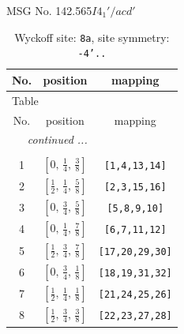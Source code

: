 \documentclass[fleqn,8pt]{jsarticle}
\begin{document}
\setcounter{MaxMatrixCols}{32}

\renewcommand{\tablename}{Table~}
\renewcommand{\figurename}{Figure~}
\begin{center}
\LARGE
MSG No. 142.565\quad$I4_{1}'/acd'$
\end{center}
\renewcommand{\arraystretch}{1.2}
\begin{longtable}{ccc}
\caption{Wyckoff site: {\tt 8a}, site symmetry: {\tt -4'..}}
 \\
 \hline \hline
No. & position & mapping \\ \hline \endfirsthead

\multicolumn{2}{l}{\tablename\ \thetable{}} \\
 \hline \hline
No. & position & mapping \\ \hline \endhead

 \hline \hline
\multicolumn{2}{r}{\footnotesize\it continued ...} \\ \endfoot

 \hline \hline
\multicolumn{2}{r}{} \\ \endlastfoot

1 & $\left[ 0,\, \frac{1}{4},\, \frac{3}{8} \right]$ & {\tt [1,4,13,14]} \\ \hline
2 & $\left[ \frac{1}{2},\, \frac{1}{4},\, \frac{5}{8} \right]$ & {\tt [2,3,15,16]} \\ \hline
3 & $\left[ 0,\, \frac{3}{4},\, \frac{5}{8} \right]$ & {\tt [5,8,9,10]} \\ \hline
4 & $\left[ 0,\, \frac{1}{4},\, \frac{7}{8} \right]$ & {\tt [6,7,11,12]} \\ \hline
5 & $\left[ \frac{1}{2},\, \frac{3}{4},\, \frac{7}{8} \right]$ & {\tt [17,20,29,30]} \\ \hline
6 & $\left[ 0,\, \frac{3}{4},\, \frac{1}{8} \right]$ & {\tt [18,19,31,32]} \\ \hline
7 & $\left[ \frac{1}{2},\, \frac{1}{4},\, \frac{1}{8} \right]$ & {\tt [21,24,25,26]} \\ \hline
8 & $\left[ \frac{1}{2},\, \frac{3}{4},\, \frac{3}{8} \right]$ & {\tt [22,23,27,28]} \\
\end{longtable}
\renewcommand{\arraystretch}{1.2}
\end{document}
